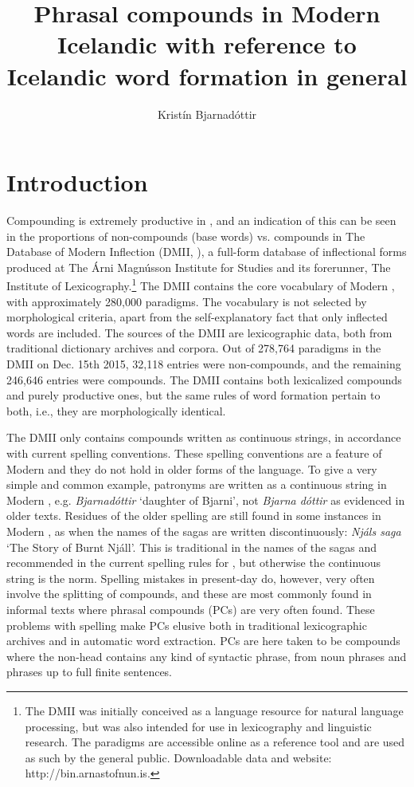 \documentclass[output=paper]{LSP/langsci}
\author{Kristín Bjarnadóttir\affiliation{The Árni Magnússon Institute
 for Icelandic Studies, University of Iceland}
}
\title{Phrasal compounds in Modern Icelandic with reference to Icelandic word formation in general}
\begin{document}
 

\section{Introduction}

Compounding is extremely productive in , and an indication of this can be seen in the proportions of non-compounds (base words) vs. compounds in The Database of Modern  Inflection (DMII, \citealt{Bjarnadóttir2012}), a full-form database of inflectional forms produced at The Árni Magnússon Institute for  Studies and its forerunner, The Institute of Lexicography.\footnote{The DMII was initially conceived as a language resource for natural language processing, but was also intended for use in lexicography and linguistic research. The paradigms are accessible online as a reference tool and are used as such by the general public. Downloadable data and website: http://bin.arnastofnun.is.} The DMII contains the core vocabulary of Modern , with approximately 280,000 paradigms. The vocabulary is not selected by morphological criteria, apart from the self-explanatory fact that only inflected words are included.  The sources of the DMII are lexicographic data, both from traditional dictionary archives and corpora. Out of 278,764 paradigms in the DMII on Dec. 15th 2015, 32,118 entries were non-compounds, and the remaining 246,646 entries were compounds. The DMII contains both lexicalized compounds and purely productive ones, but the same rules of word formation pertain to both, i.e., they are morphologically identical. 

The DMII only contains compounds written as continuous strings, in accordance with current  spelling conventions. These spelling conventions are a feature of Modern  and they do not hold in older forms of the language. To give a very simple and common example, patronyms are written as a continuous string in Modern , e.g. \textit{Bjarnadóttir} `daughter of Bjarni’, not \textit{Bjarna dóttir} as evidenced in older texts. Residues of the older spelling are still found in some instances in Modern , as when the names of the sagas are written discontinuously: \textit{Njáls saga} `The Story of Burnt Njáll’. This is traditional in the names of the sagas and recommended in the current spelling rules for , but otherwise the continuous string is the norm. Spelling mistakes in present-day  do, however, very often involve the splitting of compounds, and these are most commonly found in informal texts where phrasal compounds (PCs) are very often found. These problems with spelling make PCs elusive both in traditional lexicographic archives and in automatic word extraction. PCs are here taken to be compounds where the non-head contains any kind of syntactic phrase, from noun phrases and  phrases up to full finite sentences.
\end{document}
